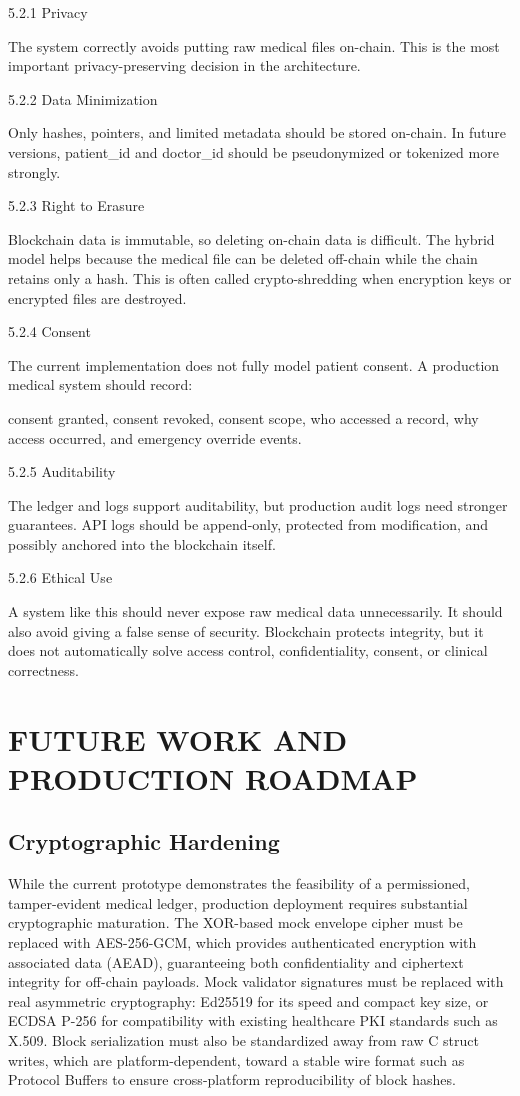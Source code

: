 \documentclass[12pt]{article}
\begin{document}
5.2.1 Privacy

The system correctly avoids putting raw medical files on-chain. This is the most important privacy-preserving decision in the architecture.

5.2.2 Data Minimization

Only hashes, pointers, and limited metadata should be stored on-chain. In future versions, patient\_id and doctor\_id should be pseudonymized or tokenized more strongly.

5.2.3 Right to Erasure

Blockchain data is immutable, so deleting on-chain data is difficult. The hybrid model helps because the medical file can be deleted off-chain while the chain retains only a hash. This is often called crypto-shredding when encryption keys or encrypted files are destroyed.

5.2.4 Consent

The current implementation does not fully model patient consent. A production medical system should record:

 consent granted, consent revoked, consent scope, who accessed a record, why access occurred, and emergency override events.

5.2.5 Auditability

The ledger and logs support auditability, but production audit logs need stronger guarantees. API logs should be append-only, protected from modification, and possibly anchored into the blockchain itself.

5.2.6 Ethical Use

A system like this should never expose raw medical data unnecessarily. It should also avoid giving a false sense of security. Blockchain protects integrity, but it does not automatically solve access control, confidentiality, consent, or clinical correctness.


\newpage
\section{FUTURE WORK AND PRODUCTION ROADMAP}

\subsection{Cryptographic Hardening}

While the current prototype demonstrates the feasibility of a permissioned, tamper-evident medical ledger, production deployment requires substantial cryptographic maturation. The XOR-based mock envelope cipher must be replaced with AES-256-GCM, which provides authenticated encryption with associated data (AEAD), guaranteeing both confidentiality and ciphertext integrity for off-chain payloads. Mock validator signatures must be replaced with real asymmetric cryptography: Ed25519 for its speed and compact key size, or ECDSA P-256 for compatibility with existing healthcare PKI standards such as X.509. Block serialization must also be standardized away from raw C struct writes, which are platform-dependent, toward a stable wire format such as Protocol Buffers to ensure cross-platform reproducibility of block hashes.
\end{document}
